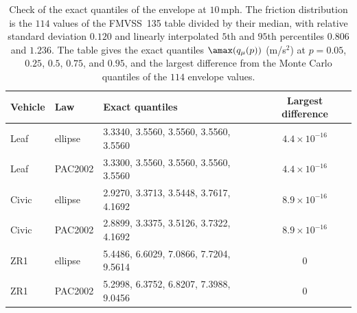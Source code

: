 \begin{table}[htbp]
\centering\small
\caption{Check of the exact quantiles of the envelope at $10$\,mph. The friction distribution is the $114$ values of the FMVSS~135 table divided by their median, with relative standard deviation $0.120$ and linearly interpolated $5$th and $95$th percentiles $0.806$ and $1.236$. The table gives the exact quantiles $\amax(q_\mu(p))$ (m/s$^2$) at $p=0.05$, $0.25$, $0.5$, $0.75$, and $0.95$, and the largest difference from the Monte Carlo quantiles of the $114$ envelope values.}\label{tab:app-quant}
\begin{tabular}{llp{6.2cm}c}
\toprule
Vehicle & Law & Exact quantiles & Largest difference\\
\midrule
Leaf & ellipse & 3.3340, 3.5560, 3.5560, 3.5560, 3.5560 & $4.4\times10^{-16}$\\
Leaf & PAC2002 & 3.3300, 3.5560, 3.5560, 3.5560, 3.5560 & $4.4\times10^{-16}$\\
Civic & ellipse & 2.9270, 3.3713, 3.5448, 3.7617, 4.1692 & $8.9\times10^{-16}$\\
Civic & PAC2002 & 2.8899, 3.3375, 3.5126, 3.7322, 4.1692 & $8.9\times10^{-16}$\\
ZR1 & ellipse & 5.4486, 6.6029, 7.0866, 7.7204, 9.5614 & $0$\\
ZR1 & PAC2002 & 5.2998, 6.3752, 6.8207, 7.3988, 9.0456 & $0$\\
\bottomrule
\end{tabular}
\end{table}

